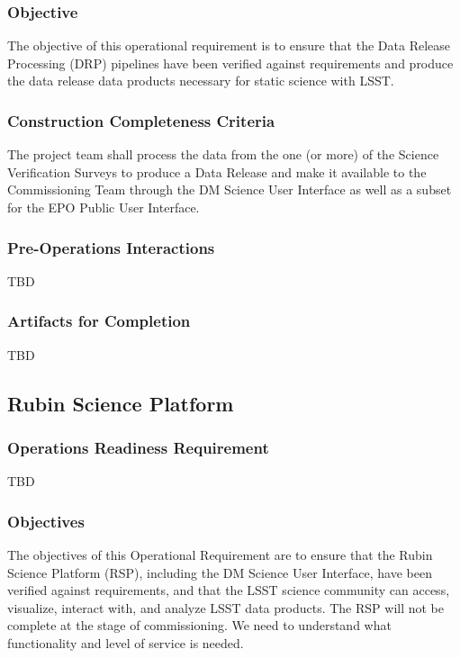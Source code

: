 \subsubsection{Objective}
The objective of this operational requirement is to ensure that the Data Release Processing (DRP) pipelines have been verified against requirements and produce the data release data products necessary for static science with LSST. 


\subsubsection{Construction Completeness Criteria}
The project team shall process the data from the one (or more) of the Science Verification Surveys to produce a Data Release and make it available to the Commissioning Team through the DM Science User Interface as well as a subset for the EPO Public User Interface.

\subsubsection{Pre-Operations Interactions}
TBD

\subsubsection{Artifacts for Completion}
TBD

\subsection{Rubin Science Platform}

\subsubsection{Operations Readiness Requirement}
TBD

\subsubsection{Objectives} 
The objectives of this Operational Requirement are to ensure that the Rubin Science Platform (RSP), including the DM Science User Interface, have been verified against requirements, and that the LSST science community can access, visualize, interact with, and analyze LSST data products. The RSP will not be complete at the stage of commissioning.  We need to understand what functionality and level of service is needed.

